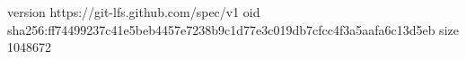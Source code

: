 version https://git-lfs.github.com/spec/v1
oid sha256:ff74499237c41e5beb4457e7238b9c1d77e3c019db7cfcc4f3a5aafa6c13d5eb
size 1048672
